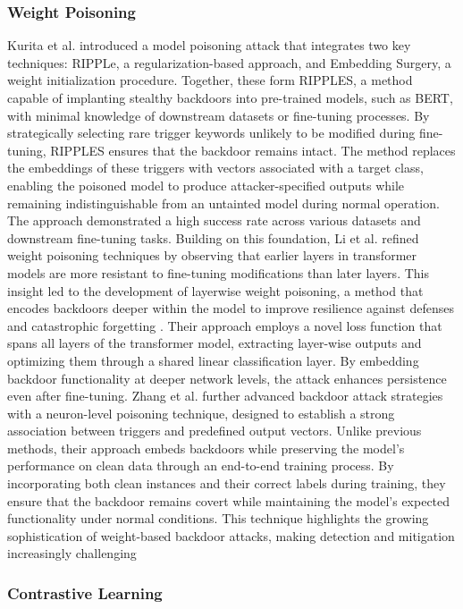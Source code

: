 \subsubsection{Weight Poisoning} 
Kurita et al. \cite{kurita_2020a} introduced a model poisoning attack that integrates two key techniques: RIPPLe, a regularization-based approach, and Embedding Surgery, a weight initialization procedure. Together, these form RIPPLES, a method capable of implanting stealthy backdoors into pre-trained models, such as BERT, with minimal knowledge of downstream datasets or fine-tuning processes. By strategically selecting rare trigger keywords unlikely to be modified during fine-tuning, RIPPLES ensures that the backdoor remains intact. The method replaces the embeddings of these triggers with vectors associated with a target class, enabling the poisoned model to produce attacker-specified outputs while remaining indistinguishable from an untainted model during normal operation. The approach demonstrated a high success rate across various datasets and downstream fine-tuning tasks. Building on this foundation, Li et al. \cite{li_2021a} refined weight poisoning techniques by observing that earlier layers in transformer models are more resistant to fine-tuning modifications than later layers. This insight led to the development of layerwise weight poisoning, a method that encodes backdoors deeper within the model to improve resilience against defenses and catastrophic forgetting \cite{mccloskey_1989a}. Their approach employs a novel loss function that spans all layers of the transformer model, extracting layer-wise outputs and optimizing them through a shared linear classification layer. By embedding backdoor functionality at deeper network levels, the attack enhances persistence even after fine-tuning. Zhang et al. \cite{zhang_2023a} further advanced backdoor attack strategies with a neuron-level poisoning technique, designed to establish a strong association between triggers and predefined output vectors. Unlike previous methods, their approach embeds backdoors while preserving the model’s performance on clean data through an end-to-end training process. By incorporating both clean instances and their correct labels during training, they ensure that the backdoor remains covert while maintaining the model’s expected functionality under normal conditions. This technique highlights the growing sophistication of weight-based backdoor attacks, making detection and mitigation increasingly challenging

\subsubsection{Contrastive Learning}

